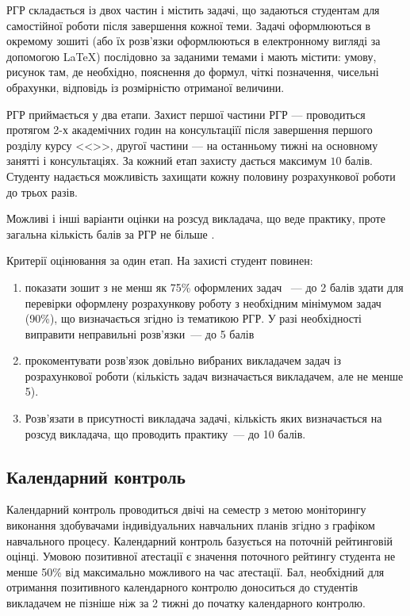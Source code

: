\documentclass{Syllabus}
\begin{document}

РГР складається із двох частин і містить задачі, що задаються студентам для самостійної роботи після завершення кожної теми. Задачі оформлюються в окремому зошиті (або їх розв'язки оформлюються в електронному вигляді за допомогою \LaTeX{}) послідовно за заданими темами і мають містити: умову, рисунок там, де необхідно, пояснення до формул, чіткі позначення, чисельні обрахунки, відповідь із розмірністю отриманої величини.

РГР приймається у два етапи. Захист першої частини РГР --- проводиться протягом 2-х академічних годин на консультаціїї після завершення першого розділу курсу <<\discipline>>, другої частини --- на останньому тижні на основному занятті і консультаціях. За кожний етап захисту дається максимум $10$ балів. Студенту надається можливість захищати кожну половину розрахункової роботи до трьох разів.


Можливі і інші варіанти оцінки на розсуд викладача, що веде практику, проте загальна кількість балів за РГР не більше \rgrBal.

Критерії оцінювання за один етап. На захисті студент повинен:
\begin{enumerate}[label=$\bullet$]
	\item показати зошит з не менш як 75\% оформлених задач~ --- до 2 балів
	      здати для перевірки оформлену розрахункову роботу з необхідним мінімумом задач (90\%), що визначається згідно із тематикою РГР. У разі необхідності виправити неправильні розв’язки~--- до 5 балів
	\item прокоментувати розв’язок довільно вибраних викладачем задач із розрахункової роботи (кількість задач визначається викладачем, але не менше 5).
	\item  Розв’язати в присутності викладача задачі, кількість яких визначається на розсуд викладача, що проводить практику~--- до 10 балів.
\end{enumerate}


\subsection*{Календарний контроль}

Календарний контроль проводиться двічі на семестр з метою моніторингу виконання здобувачами індивідуальних навчальних планів згідно з графіком навчального процесу. Календарний контроль базується на поточній рейтинговій оцінці. Умовою позитивної атестації є значення поточного рейтингу студента не менше 50\% від максимально можливого на час атестації. Бал, необхідний для отримання позитивного календарного контролю доноситься до студентів викладачем не пізніше ніж за 2 тижні до початку календарного контролю.
\end{document}
